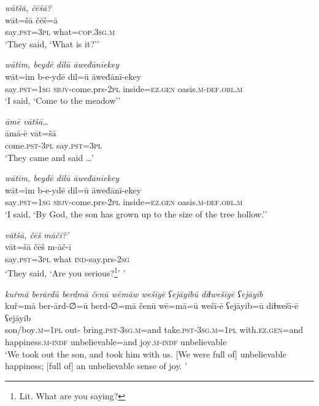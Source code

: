 \ea \label{ZQ.47}
\textit{wātšā, čēšā?} \\ 
\gll wāt=šā čēš=ā \\ 
 say\textsc{.pst}\textsc{=3pl} what\textsc{=cop}\textsc{.3sg}\textsc{.m} \\ 
\glt `They said, ‘What is it?’'
\z 
 
\ea \label{ZQ.48}
\textit{wātim, beydē dilū āweđānīekey} \\ 
\gll wāt=im b-e-ydē dil=ū āweđānī-ekey \\ 
 say\textsc{.pst}\textsc{=\textsc{1sg}} \textsc{sbjv-}come.prs-\textsc{2pl} inside\textsc{=ez.gen} oasis\textsc{.m}\textsc{-def}\textsc{.obl}\textsc{.m} \\ 
\glt `I said, ‘Come to the meadow’'
\z 
 
\ea \label{ZQ.49}
\textit{āmē vātšā…} \\ 
\gll āmā-ē vāt=šā \\ 
 come\textsc{.pst}\textsc{-3pl} say\textsc{.pst}\textsc{=3pl} \\ 
\glt `They came and said …'
\z 
 
\ea \label{ZQ.50}
\textit{wātim, beydē dilū āweđānīekey} \\ 
\gll wāt=im b-e-ydē dil=ū āweđānī-ekey \\ 
 say\textsc{.pst}\textsc{=\textsc{1sg}} \textsc{sbjv-}come.prs-\textsc{2pl} inside\textsc{=ez.gen} oasis\textsc{.m}\textsc{-def}\textsc{.obl}\textsc{.m} \\ 
\glt `I said, ‘By God, the son has grown up to the size of the tree hollow.’'
\z 
 
\ea \label{ZQ.51}
\textit{vātšā, čēš māčī?’} \\ 
\gll vāt=šā čēš m-āč-ī \\ 
 say\textsc{.pst}\textsc{=3pl} what \textsc{ind-}say.prs-\textsc{2sg} \\ 
\glt `They said, ‘Are you serious?\footnote{Lit. What are you saying?}’ '
\z 
 
\ea \label{ZQ.53}
\textit{kuřmā berārdū berdmā čenū wēmāw wešīyē ʕejāyibū diɫwešīyē ʕejāyib} \\ 
\gll kuř=mā ber-ārd-∅=ū berd-∅=mā čenū wē=mā=ū wešī-ē ʕejāyib=ū diɫwešī-ē ʕejāyib \\ 
 son/boy\textsc{.m}\textsc{=\textsc{1pl}} out- bring\textsc{.pst}\textsc{-3sg}\textsc{.m}=and take\textsc{.pst}\textsc{-3sg}\textsc{.m}\textsc{=\textsc{1pl}} with\textsc{.ez.gen}=and happiness\textsc{.m}\textsc{-indf} unbelievable=and joy\textsc{.m}\textsc{-indf} unbelievable \\ 
\glt `We took out the son, and took him with us. [We were full of] unbelievable happiness; [full of] an unbelievable sense of joy. '
\z 
 
